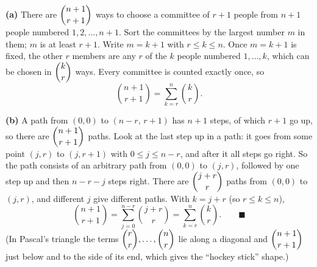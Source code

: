 \textbf{(a)} There are $\dbinom{n+1}{r+1}$ ways to choose a committee of $r+1$ people from $n+1$ people numbered $1,2,\ldots,n+1$. Sort the committees by the largest number $m$ in them; $m$ is at least $r+1$. Write $m=k+1$ with $r\le k\le n$. Once $m=k+1$ is fixed, the other $r$ members are any $r$ of the $k$ people numbered $1,\ldots,k$, which can be chosen in $\dbinom kr$ ways. Every committee is counted exactly once, so
\[\binom{n+1}{r+1}=\sum_{k=r}^{n}\binom kr .\]

\textbf{(b)} A path from $(0,0)$ to $(n-r,\,r+1)$ has $n+1$ steps, of which $r+1$ go up, so there are $\dbinom{n+1}{r+1}$ paths. Look at the last step up in a path: it goes from some point $(j,r)$ to $(j,r+1)$ with $0\le j\le n-r$, and after it all steps go right. So the path consists of an arbitrary path from $(0,0)$ to $(j,r)$, followed by one step up and then $n-r-j$ steps right. There are $\dbinom{j+r}{r}$ paths from $(0,0)$ to $(j,r)$, and different $j$ give different paths. With $k=j+r$ (so $r\le k\le n$),
\[\binom{n+1}{r+1}=\sum_{j=0}^{n-r}\binom{j+r}{r}=\sum_{k=r}^{n}\binom kr. \qquad\blacksquare\]
(In Pascal's triangle the terms $\dbinom rr,\ldots,\dbinom nr$ lie along a diagonal and $\dbinom{n+1}{r+1}$ just below and to the side of its end, which gives the ``hockey stick'' shape.)
